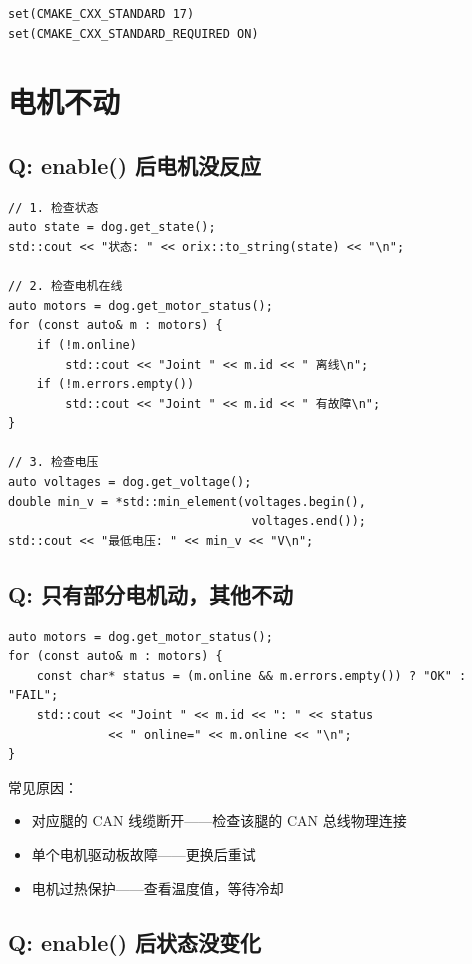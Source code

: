 \documentclass[a4paper,11pt,openany]{book}
\begin{document}
\begin{lstlisting}[style=cmake]
set(CMAKE_CXX_STANDARD 17)
set(CMAKE_CXX_STANDARD_REQUIRED ON)
\end{lstlisting}

\section{电机不动}

\subsection{Q: enable() 后电机没反应}

\begin{lstlisting}[style=cpp]
// 1. 检查状态
auto state = dog.get_state();
std::cout << "状态: " << orix::to_string(state) << "\n";

// 2. 检查电机在线
auto motors = dog.get_motor_status();
for (const auto& m : motors) {
    if (!m.online)
        std::cout << "Joint " << m.id << " 离线\n";
    if (!m.errors.empty())
        std::cout << "Joint " << m.id << " 有故障\n";
}

// 3. 检查电压
auto voltages = dog.get_voltage();
double min_v = *std::min_element(voltages.begin(),
                                  voltages.end());
std::cout << "最低电压: " << min_v << "V\n";
\end{lstlisting}

\subsection{Q: 只有部分电机动，其他不动}

\begin{lstlisting}[style=cpp]
auto motors = dog.get_motor_status();
for (const auto& m : motors) {
    const char* status = (m.online && m.errors.empty()) ? "OK" : "FAIL";
    std::cout << "Joint " << m.id << ": " << status
              << " online=" << m.online << "\n";
}
\end{lstlisting}

常见原因：
\begin{itemize}[nosep]
  \item 对应腿的 CAN 线缆断开------检查该腿的 CAN 总线物理连接
  \item 单个电机驱动板故障------更换后重试
  \item 电机过热保护------查看温度值，等待冷却
\end{itemize}

\subsection{Q: enable() 后状态没变化}
\end{document}
